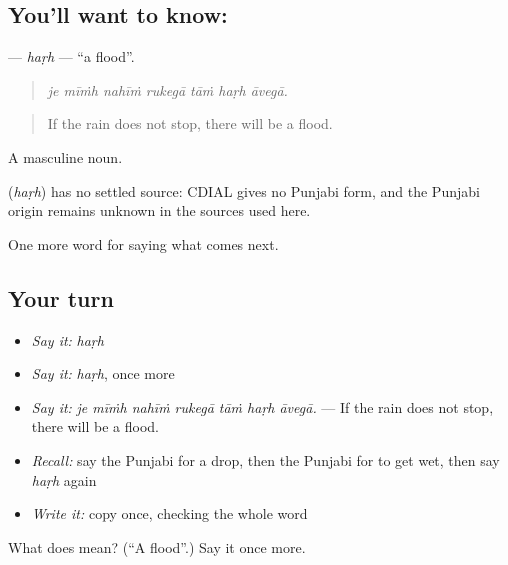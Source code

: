 \subsection*{You'll want to know: }
\textbf{} — \emph{haṛh} — \textquotedblleft{}a flood\textquotedblright{}.

\begin{quote}
      
\end{quote}

\begin{quote}
\emph{je mīṁh nahīṁ rukegā tāṁ haṛh āvegā.}
\end{quote}

\begin{quote}
If the rain does not stop, there will be a flood.
\end{quote}

A masculine noun.

\begin{cousinweb}
\textbf{} (\emph{haṛh}) has no settled source: CDIAL gives no Punjabi form, and the Punjabi origin remains unknown in the sources used here.
\end{cousinweb}

\begin{grammarlens}[title={What you've built}]
One more word for saying what comes next.
\end{grammarlens}

\subsection*{Your turn}
\begin{itemize}
\raggedright
  \item \emph{Say it:} \emph{haṛh}
  \item \emph{Say it:} \emph{haṛh}, once more
  \item \emph{Say it:} \emph{je mīṁh nahīṁ rukegā tāṁ haṛh āvegā.} — If the rain does not stop, there will be a flood.
  \item \emph{Recall:} say the Punjabi for a drop, then the Punjabi for to get wet, then say \emph{haṛh} again
  \item \emph{Write it:} copy \textbf{} once, checking the whole word
\end{itemize}

\begin{tcolorbox}[breakable,colback=teal!4,colframe=teal!35!black,title={Before you move on}]
What does  mean? (\textquotedblleft{}A flood\textquotedblright{}.) Say it once more.
\end{tcolorbox}
